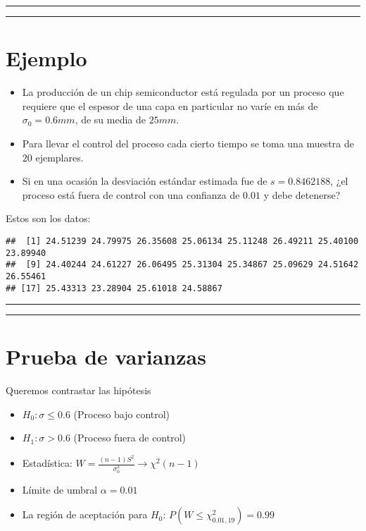 \documentclass[
]{book}
\begin{document}
\begin{center}\rule{0.5\linewidth}{0.5pt}\end{center}

\begin{center}\rule{0.5\linewidth}{0.5pt}\end{center}

\hypertarget{ejemplo-18}{%
\section{Ejemplo}\label{ejemplo-18}}

\begin{itemize}
\item
  La producción de un chip semiconductor está regulada por un proceso que requiere que el espesor de una capa en particular no varíe en más de \(\sigma_0=0.6mm\), de su media de \(25mm\).
\item
  Para llevar el control del proceso cada cierto tiempo se toma una muestra de \(20\) ejemplares.
\item
  Si en una ocasión la desviación estándar estimada fue de \(s=0.8462188\), ¿el proceso está fuera de control con una confianza de \(0.01\) y debe detenerse?
\end{itemize}

Estos son los datos:

\begin{verbatim}
##  [1] 24.51239 24.79975 26.35608 25.06134 25.11248 26.49211 25.40100 23.89940
##  [9] 24.40244 24.61227 26.06495 25.31304 25.34867 25.09629 24.51642 26.55461
## [17] 25.43313 23.28904 25.61018 24.58867
\end{verbatim}

\begin{center}\rule{0.5\linewidth}{0.5pt}\end{center}

\begin{center}\rule{0.5\linewidth}{0.5pt}\end{center}

\hypertarget{prueba-de-varianzas-4}{%
\section{Prueba de varianzas}\label{prueba-de-varianzas-4}}

Queremos contrastar las hipótesis

\begin{itemize}
\item
  \(H_0:\sigma \leq 0.6\) (Proceso bajo control)
\item
  \(H_1:\sigma > 0.6\) (Proceso fuera de control)
\item
  Estadística: \(W=\frac{(n-1)S^2}{\sigma_0^2} \rightarrow \chi^2(n-1)\)
\item
  Límite de umbral \(\alpha=0.01\)
\item
  La región de aceptación para \(H_0\): \(P(W\leq \chi^2_{0.01,19})=0.99\)
\end{itemize}
\end{document}
